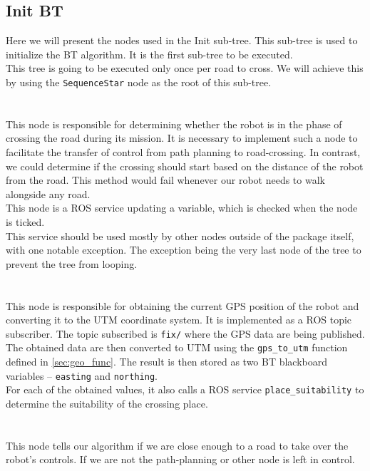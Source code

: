 \subsection{Init BT}
\label{sec:Init-BT-impl}
    Here we will present the nodes used in the Init sub-tree. This sub-tree is used to initialize the BT algorithm. It is the first sub-tree to be executed.\\
    This tree is going to be executed only once per road to cross. We will achieve this by using the \texttt{SequenceStar} node as the root of this sub-tree.\\\\
    \\
        This node is responsible for determining whether the robot is in the phase of crossing the road during its mission. It is necessary to implement such a node to facilitate the transfer of control from path planning to road-crossing. In contrast, we could determine if the crossing should start based on the distance of the robot from the road. This method would fail whenever our robot needs to walk alongside any road.\\
        This node is a ROS service updating a variable, which is checked when the node is ticked.\\
        This service should be used mostly by other nodes outside of the package itself, with one notable exception. The exception being the very last node of the tree to prevent the tree from looping.\\\\
    \\
        This node is responsible for obtaining the current GPS position of the robot and converting it to the UTM coordinate system. It is implemented as a ROS topic subscriber. The topic subscribed is \texttt{fix/} where the GPS data are being published.\\
        The obtained data are then converted to UTM using the \texttt{gps\_to\_utm} function defined in \ref{sec:geo_func}. The result is then stored as two BT blackboard variables -- \texttt{easting} and \texttt{northing}.\\
        For each of the obtained values, it also calls a ROS service \texttt{place\_suitability} to determine the suitability of the crossing place.\\\\
    \\
        This node tells our algorithm if we are close enough to a road to take over the robot's controls. If we are not the path-planning or other node is left in control.\\
